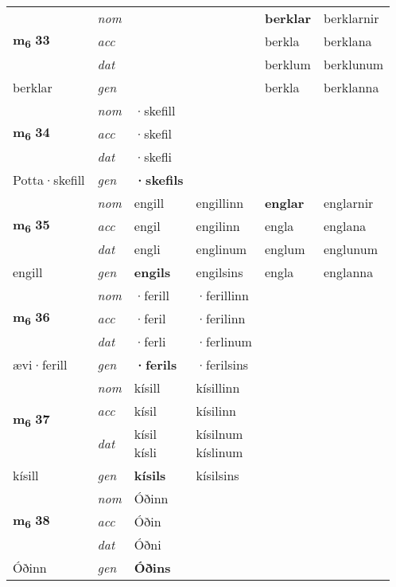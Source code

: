 \begin{longtable}[l]{X>{\footnotesize\itshape}XXXXX}
\multirow{3}{*}{{{\textbf{m{\textsubscript{6}}} \Large{\textbf{33}}}}} & nom &  &  & \textbf{berklar} & berklarnir \\*
 & acc &  &  & berkla & berklana \\*
 & dat &  &  & berklum & berklunum \\*
 {\footnotesize{berklar}} & gen & \textbf{} &  & berkla & berklanna \\
\cmidrule{1-6}

\multirow{3}{*}{{{\textbf{m{\textsubscript{6}}} \Large{\textbf{34}}}}} & nom & ·skefill &  & \textbf{} &  \\*
 & acc & ·skefil &  &  &  \\*
 & dat & ·skefli &  &  &  \\*
 {\footnotesize{Potta\allowbreak ·skefill}} & gen & \textbf{·skefils} &  &  &  \\
\cmidrule{1-6}

\multirow{3}{*}{{{\textbf{m{\textsubscript{6}}} \Large{\textbf{35}}}}} & nom & engill & engillinn & \textbf{englar} & englarnir \\*
 & acc & engil & engilinn & engla & englana \\*
 & dat & engli & englinum & englum & englunum \\*
 {\footnotesize{engill}} & gen & \textbf{engils} & engilsins & engla & englanna \\
\cmidrule{1-6}

\multirow{3}{*}{{{\textbf{m{\textsubscript{6}}} \Large{\textbf{36}}}}} & nom & ·ferill & ·ferillinn & \textbf{} &  \\*
 & acc & ·feril & ·ferilinn &  &  \\*
 & dat & ·ferli & ·ferlinum &  &  \\*
 {\footnotesize{ævi\allowbreak ·ferill}} & gen & \textbf{·ferils} & ·ferilsins &  &  \\
\cmidrule{1-6}

\multirow{3}{*}{{{\textbf{m{\textsubscript{6}}} \Large{\textbf{37}}}}} & nom & kísill & kísillinn & \textbf{} &  \\*
 & acc & kísil & kísilinn &  &  \\*
 & dat & \specialcell{kísil\\ kísli} & \specialcell{kísilnum\\ kíslinum} &  &  \\*
 {\footnotesize{kísill}} & gen & \textbf{kísils} & kísilsins &  &  \\
\cmidrule{1-6}

\multirow{3}{*}{{{\textbf{m{\textsubscript{6}}} \Large{\textbf{38}}}}} & nom & Óðinn &  & \textbf{} &  \\*
 & acc & Óðin &  &  &  \\*
 & dat & Óðni &  &  &  \\*
 {\footnotesize{Óðinn}} & gen & \textbf{Óðins} &  &  &  \\
\cmidrule{1-6}


\end{longtable}
